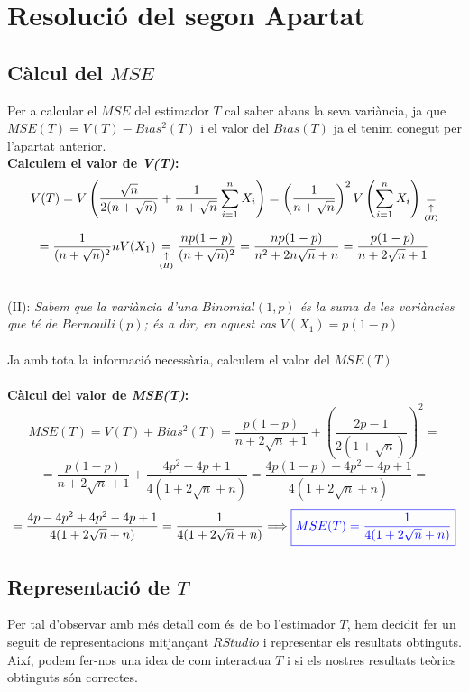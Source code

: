 \documentclass[12pt]{article}
\begin{document}
\section{Resolució del segon Apartat}

\subsection{Càlcul del $MSE$}
Per a calcular el $MSE$ del estimador $T$ cal saber abans la seva variància, ja que $MSE(T)=V(T)-Bias^2(T)$ i el valor del $Bias(T)$ ja el tenim conegut per l'apartat anterior.\\
\textbf{Calculem el valor de \textit{V(T)}:}\\
\begin{equation*}
V(T)=V\left(\frac{\sqrt{n}}{2(n+\sqrt{n})}+\frac{1}{n+\sqrt{n}}\sum^{n}_{i=1}{X_i}\right)=\left(\frac{1}{n+\sqrt{n}}\right)^2V\left(\sum^{n}_{i=1}{X_i}\right)\underset{\underset{\textbf{(\textit{II})}}{\uparrow}}{=}
\end{equation*}
\begin{equation*}
=\frac{1}{(n+\sqrt{n})^2}nV(X_1)\underset{\underset{\textbf{(\textit{II})}}{\uparrow}}{=}\frac{np(1-p)}{(n+\sqrt{n})^2}=\frac{np(1-p)}{n^2+2n\sqrt{n}+n}=\frac{p(1-p)}{n+2\sqrt{n}+1}
\end{equation*}
\\
(II): \textit{Sabem que la variància d'una $Binomial(1,p)$ és la suma de les variàncies que té de $Bernoulli(p)$; és a dir, en aquest cas $V(X_1)=p(1-p)$}\\\\
Ja amb tota la informació necessària, calculem el valor del $MSE(T)$\\\\
\textbf{Càlcul del valor de \textit{MSE(T)}:}\\
\begin{equation*}
MSE(T)=V(T)+Bias^2(T)=\frac{p(1-p)}{n+2\sqrt{n}+1}+\left(\frac{2p-1}{2(1+\sqrt{n})}\right)^2=
\end{equation*}
\begin{equation*}
= \frac{p(1-p)}{n+2\sqrt{n}+1}+\frac{4p^2-4p+1}{4(1+2\sqrt{n}+n)} = \frac{4p(1-p)+4p^2-4p+1}{4(1+2\sqrt{n}+n)} =
\end{equation*}
\begin{equation*}
= \frac{4p -4p^2 +4p^2 -4p +1}{4(1+2\sqrt{n}+n)} = \frac{1}{4(1+2\sqrt{n}+n)} \Longrightarrow \textcolor{blue}{ \boxed{MSE(T)=\frac{1}{4(1+2\sqrt{n}+n)}}}
\end{equation*}
\newpage
\subsection{Representació de $T$}
Per tal d'observar amb més detall com és de bo l'estimador $T$, hem decidit fer un seguit de representacions mitjançant $RStudio$ i representar els resultats obtinguts. Així, podem fer-nos una idea de com interactua $T$ i si els nostres resultats teòrics obtinguts són correctes.
\end{document}
